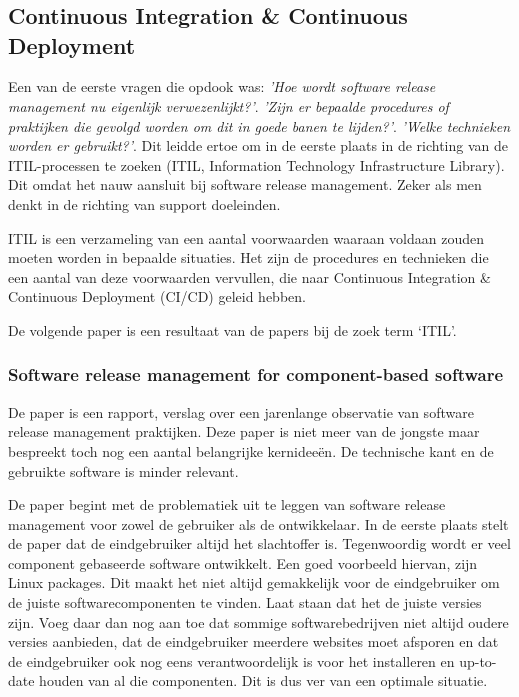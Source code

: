 \chapter{}
\label{ch:stand-van-zaken}


\section{Continuous Integration \& Continuous Deployment}
Een van de eerste vragen die opdook was: \emph{'Hoe wordt software release management nu eigenlijk verwezenlijkt?'}. \emph{'Zijn er bepaalde procedures of praktijken die gevolgd worden om dit in goede banen te lijden?'}. \emph{'Welke technieken worden er gebruikt?'}. Dit leidde ertoe om in de eerste plaats in de richting van de ITIL-processen te zoeken (ITIL, Information Technology Infrastructure Library). Dit omdat het nauw aansluit bij software release management. Zeker als men denkt in de richting van support doeleinden. 

ITIL is een verzameling van een aantal voorwaarden waaraan voldaan zouden moeten worden in bepaalde situaties. Het zijn de procedures en technieken die een aantal van deze voorwaarden vervullen, die naar Continuous Integration \& Continuous Deployment (CI/CD) geleid hebben. 

De volgende paper \autocite{Hoek2002} is een resultaat van de papers bij de zoek term ‘ITIL’.

\subsection{Software release management for component-based software}
De paper \autocite{Hoek2002} is een rapport, verslag over een jarenlange observatie van software release management praktijken. Deze paper \autocite{Hoek2002} is niet meer van de jongste maar bespreekt toch nog een aantal belangrijke kernideeën. De technische kant en de gebruikte software is minder relevant.

De paper \autocite{Hoek2002} begint met de problematiek uit te leggen van software release management voor zowel de gebruiker als de ontwikkelaar. In de eerste plaats stelt de paper dat de eindgebruiker altijd het slachtoffer is. Tegenwoordig wordt er veel component gebaseerde software ontwikkelt. Een goed voorbeeld hiervan, zijn Linux packages. Dit maakt het niet altijd gemakkelijk voor de eindgebruiker om de juiste softwarecomponenten te vinden. Laat staan dat het de juiste versies zijn. Voeg daar dan nog aan toe dat sommige softwarebedrijven niet altijd oudere versies aanbieden, dat de eindgebruiker meerdere websites moet afsporen en dat de eindgebruiker ook nog eens verantwoordelijk is voor het installeren en up-to-date houden van al die componenten. Dit is dus ver van een optimale situatie.

